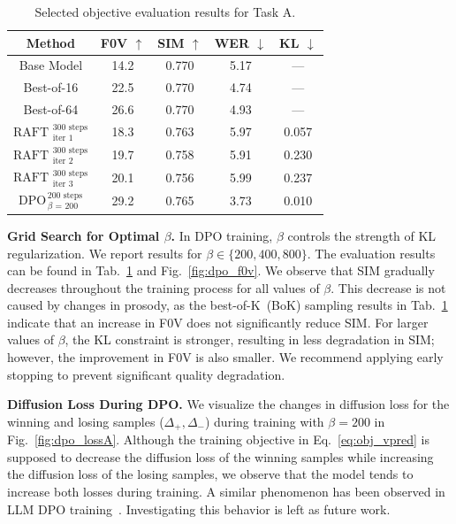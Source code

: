 \documentclass{article}
\begin{document}
\begin{table}[h]
    \centering
    \vspace{-0.3cm}
    \begin{tabular}{ccccc}\toprule
         Method&  F0V $\uparrow$& SIM $\uparrow$ &WER $\downarrow$ &KL $\downarrow$\\\midrule
         Base Model& 
     14.2& 0.770&5.17 &---\\ 
 Best-of-16& 22.5& 0.770&4.74 &---\\
 Best-of-64& 26.6& 0.770&4.93 &---\\
 $\text{RAFT }^{\text{300 steps}}_{\text{iter }1}$& 18.3& 0.763&5.97 &0.057\\
 $\text{RAFT }^{\text{300 steps}}_{\text{iter }2}$& 19.7& 0.758&5.91 &0.230\\
 $\text{RAFT }^{\text{300 steps}}_{\text{iter }3}$& 20.1& 0.756&5.99 &0.237\\ 
 $\text{DPO}^{\,\text{200 steps}}_{\,\beta\text{ = 200}}$& 29.2& 0.765&3.73 &0.010\\ \bottomrule\end{tabular}
\vspace{-0.15cm}
    \caption{Selected objective evaluation results for Task A.}
    \label{tab:A}
\vspace{-0.3cm}
\end{table}

\noindent
\textbf{Grid Search for Optimal $\beta$.} In DPO training, $\beta$ controls the strength of KL regularization. We report results for $\beta \in \{200, \allowbreak 400, \allowbreak 800\}$. The evaluation results can be found in Tab.~\ref{tab:A} and Fig.~\ref{fig:dpo_f0v}. We observe that SIM gradually decreases throughout the training process for all values of $\beta$. This decrease is not caused by changes in prosody, as the best-of-K~(BoK) sampling results in Tab.~\ref{tab:A} indicate that an increase in F0V does not significantly reduce SIM. For larger values of $\beta$, the KL constraint is stronger, resulting in less degradation in SIM; however, the improvement in F0V is also smaller. We recommend applying early stopping to prevent significant quality degradation.

\noindent
\textbf{Diffusion Loss During DPO.} We visualize the changes in diffusion loss for the winning and losing samples ($\Delta_+, \Delta_-$) during training with $\beta = 200$ in Fig.~\ref{fig:dpo_lossA}. Although the training objective in Eq.~\eqref{eq:obj_vpred} is supposed to decrease the diffusion loss of the winning samples while increasing the diffusion loss of the losing samples, we observe that the model tends to increase both losses during training. A similar phenomenon has been observed in LLM DPO training~\cite{DPO3DP}. Investigating this behavior is left as future work.
\end{document}

